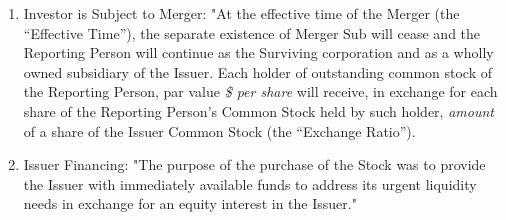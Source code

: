 \documentclass[12pt]{article}
\begin{document}
\begin{appendices}
\begin{enumerate}
\item Investor is Subject to Merger: "At the effective time of the Merger (the “Effective Time”), the separate existence of Merger Sub will cease and the Reporting Person will continue as the Surviving corporation and as a wholly owned subsidiary of the Issuer. Each holder of outstanding common stock of the Reporting Person, par value \emph{\$ per share} will receive, in exchange for each share of the Reporting Person's Common Stock held by such holder, \emph{amount} of a share of the Issuer Common Stock (the “Exchange Ratio”).

\item Issuer Financing: "The purpose of the purchase of the Stock was to provide the Issuer with immediately available funds to address its urgent liquidity needs in exchange for an equity interest in the Issuer."
\end{enumerate}

\end{appendices}
\end{document}
